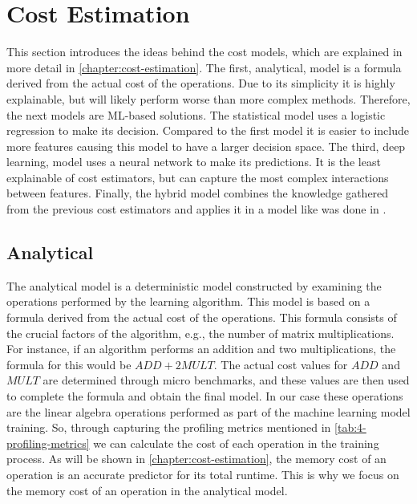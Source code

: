 \section{Cost Estimation}
\label{sec:4-cost-estimation}
This section introduces the ideas behind the cost models, which are explained in more detail in \autoref{chapter:cost-estimation}. The first, analytical, model is a formula derived from the actual cost of the operations. Due to its simplicity it is highly explainable, but will likely perform worse than more complex methods. Therefore, the next models are ML-based solutions. The statistical model uses a logistic regression to make its decision. Compared to the first model it is easier to include more features causing this model to have a larger decision space. The third, deep learning, model uses a neural network to make its predictions. It is the least explainable of cost estimators, but can capture the most complex interactions between features. Finally, the hybrid model combines the knowledge gathered from the previous cost estimators and applies it in a model like was done in \cite{halide_cost_model}.

\subsection{Analytical}
The analytical model is a deterministic model constructed by examining the operations performed by the learning algorithm. This model is based on a formula derived from the actual cost of the operations. This formula consists of the crucial factors of the algorithm, e.g., the number of matrix multiplications. For instance, if an algorithm performs an addition and two multiplications, the formula for this would be $ADD + 2MULT$. The actual cost values for $ADD$ and $MULT$ are determined through micro benchmarks, and these values are then used to complete the formula and obtain the final model. In our case these operations are the linear algebra operations performed as part of the machine learning model training. So, through capturing the profiling metrics mentioned in \autoref{tab:4-profiling-metrics} we can calculate the cost of each operation in the training process. As will be shown in \autoref{chapter:cost-estimation}, the memory cost of an operation is an accurate predictor for its total runtime. This is why we focus on the memory cost of an operation in the analytical model.


